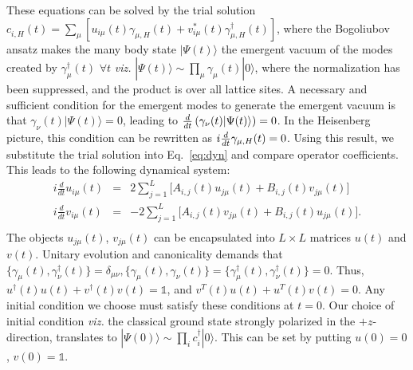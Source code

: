 \documentclass[aps,prl, notitlepage]{revtex4-1}
\begin{document}
These equations can be solved by the trial solution $c^{\;}_{i,H}(t) = \sum_\mu \left[u_{i\mu}(t)\gamma_{\mu,H}(t)+v^\ast_{i\mu}(t)\gamma^\dagger_{\mu,H}(t)\right]$, where the Bogoliubov ansatz makes the many body state $|\Psi(t)\rangle$ the emergent vacuum of the modes  created by $\gamma^\dagger_{\mu}(t)$ $\forall t$ \textit{viz.} $|\Psi(t)\rangle \sim \prod_\mu \gamma_\mu(t) |0\rangle$, where the normalization has been suppressed, and the product is over all lattice sites. A necessary and sufficient condition for the emergent modes to generate the emergent vacuum is that $\gamma_\nu(t)|\Psi(t)\rangle = 0$, leading to  $ {d\over dt} \left( \gamma_\nu(t)|\Psi(t)\rangle \right) = 0$. In the Heisenberg picture, this condition can be rewritten as $i{d\over dt}\gamma_{\mu,H}(t)=0$. Using this result, we substitute the trial solution into Eq.~\ref{eq:dyn} and compare operator coefficients. This leads to the following dynamical system:
\begin{eqnarray} 
\label{BdG_tdep:eqn}
i\frac{d}{dt}u_{i\mu}(t) &=&  {2} \sum_{j=1}^{L} \bigg[A_{i,j}(t)u_{j\mu}(t)+ B_{i,j}(t)v_{j\mu}(t) \bigg] \nonumber \\
i\frac{d}{dt}v_{i\mu}(t) &=& -{2}\sum_{j=1}^{L} \bigg[A_{i,j}(t)v_{j\mu}(t)+ B_{i,j}(t)u_{j\mu}(t) \bigg].\nonumber \\
\end{eqnarray}
The objects $u_{j\mu}(t)$, $v_{j\mu}(t)$ can be encapsulated into $L\times L$ matrices $u(t)$ and $v(t)$. Unitary evolution and canonicality demands that $\{\gamma_\mu(t),\gamma^\dagger_\nu(t)\}=\delta_{\mu\nu},\{\gamma_\mu(t),\gamma_\nu(t)\}=\{\gamma^\dagger_\mu(t),\gamma^\dagger_\nu(t)\}=0$. Thus, $u^\dagger(t) u(t) + v^\dagger(t) v(t) = \mathds{1}$, and $v^T(t)u(t)+u^T(t)v(t) = 0$.  Any initial condition we choose must satisfy these conditions at $t=0$. Our choice of initial condition \textit{viz.} the classical ground state strongly polarized in the $+z$-direction, translates to $|\Psi(0)\rangle \sim \prod_i c^\dagger_i |0\rangle$. This can be set by putting $u(0)=0$, $v(0)=\mathds{1}$.
\end{document}
